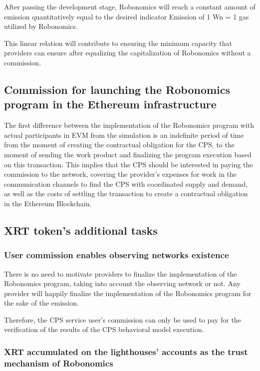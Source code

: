 \documentclass{article}
\begin{document}
After passing the development stage, Robonomics will reach a constant amount of emission quantitatively equal to the desired indicator Emission of 1 Wn = 1 gas utilized by Robonomics.

This linear relation will contribute to ensuring the minimum capacity that providers can ensure after equalizing the capitalization of Robonomics without a commission.

\subsection{Commission for launching the Robonomics program in the Ethereum infrastructure}

The first difference between the implementation of the Robonomics program with actual participants in EVM from the simulation is an indefinite period of time from the moment of creating the contractual obligation for the CPS, to the moment of sending the work product and finalizing the program execution based on this transaction. This implies that the CPS should be interested in paying the commission to the network, covering the provider's expenses for work in the communication channels to find the CPS with coordinated supply and demand, as well as the costs of settling the transaction to create a contractual obligation in the Ethereum Blockchain.

\subsection{XRT token’s additional tasks}
\subsubsection{User commission enables observing networks existence}

There is no need to motivate providers to finalize the implementation of the Robonomics program, taking into account the observing network or not. Any provider will happily finalize the implementation of the Robonomics program for the sake of the emission.
 
Therefore, the CPS service user’s commission can only be used to pay for the verification of the results of the CPS behavioral model execution.

\subsubsection{XRT accumulated on the lighthouses’ accounts as the trust mechanism of Robonomics}
\end{document}
